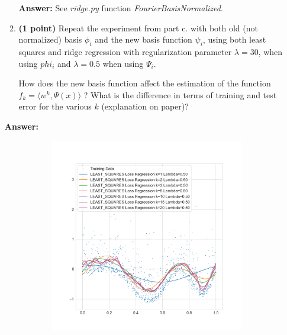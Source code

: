 \documentclass{./tufte-handout}
\begin{document}
\begin{enumerate}[(a)]
\begin{enumerate}
    \textbf{Answer:}
    See \emph{ridge.py} function \emph{ FourierBasisNormalized}.

    \item \textbf{(1 point)} Repeat the experiment from part c. with both old (not normalized) basis 
    $\phi_i$ and the new basis function $\psi_i$, using both least squares and ridge regression 
    with regularization parameter $\lambda = 30$, when using $phi_i$ and $\lambda=0.5$ when using $\Psi_i$. 

    How does the new basis function affect the estimation of the 
    function $f_k = \langle w^k, \Psi(x)\rangle$ ? 
    What is the difference in terms of training and test error 
    for the various $k$ (explanation on paper)?
\end{enumerate}

   \textbf{Answer:}
   \begin{figure}
    \centering
    \begin{subfigure}[b]{.5\textwidth}
        \includegraphics{../figures/normalized_least_squares_regression_all_k_lambda_0.50.png}
    \end{subfigure}%
    \begin{subfigure}[b]{.5\textwidth}

\end{subfigure}
\end{figure}
\end{enumerate}
\end{document}
